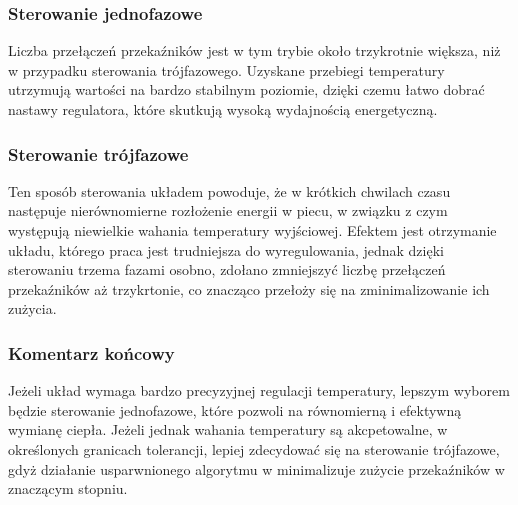 \documentclass[a4paper,twoside,12pt]{book}
\begin{document}
\subsubsection{Sterowanie jednofazowe}
Liczba przełączeń przekaźników jest w tym trybie około trzykrotnie większa, niż w przypadku sterowania trójfazowego. Uzyskane przebiegi temperatury utrzymują wartości na bardzo stabilnym poziomie, dzięki czemu łatwo dobrać nastawy regulatora, które skutkują wysoką wydajnością energetyczną.

\subsubsection{Sterowanie trójfazowe}
Ten sposób sterowania układem powoduje, że w krótkich chwilach czasu następuje nierównomierne rozłożenie energii w piecu, w związku z czym występują niewielkie wahania temperatury wyjściowej. Efektem jest otrzymanie układu, którego praca jest trudniejsza do wyregulowania, jednak dzięki sterowaniu trzema fazami osobno, zdołano zmniejszyć liczbę przełączeń przekaźników aż trzykrtonie, co znacząco przełoży się na zminimalizowanie ich zużycia.

\subsubsection{Komentarz końcowy}
Jeżeli układ wymaga bardzo precyzyjnej regulacji temperatury, lepszym wyborem będzie sterowanie jednofazowe, które pozwoli na równomierną i efektywną wymianę ciepła. Jeżeli jednak wahania temperatury są akcpetowalne, w określonych granicach tolerancji, lepiej zdecydować się na sterowanie trójfazowe, gdyż działanie usparwnionego algorytmu w minimalizuje zużycie przekaźników w znaczącym stopniu.

\backmatter

\printbibliography
{}
\label{ch:08}
\end{document}
